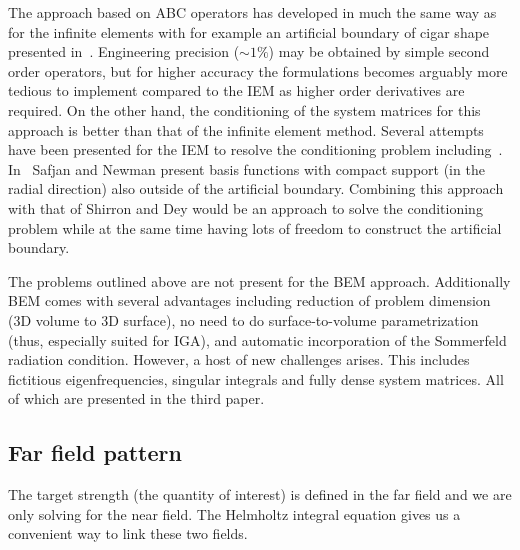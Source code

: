 The approach based on ABC operators has developed in much the same way as for the infinite elements with for example an artificial boundary of cigar shape presented in~\cite{Tezaur2001tdf}. Engineering precision ($\sim 1\%$) may be obtained by simple second order operators, but for higher accuracy the formulations becomes arguably more tedious to implement compared to the IEM as higher order derivatives are required. On the other hand, the conditioning of the system matrices for this approach is better than that of the infinite element method. Several attempts have been presented for the IEM to resolve the conditioning problem including~\cite{Dreyer2003ico,Safjan2001tic,Safjan2002tdi}. In~\cite{Safjan2002tdi} Safjan and Newman present basis functions with compact support (in the radial direction) also outside of the artificial boundary. Combining this approach with that of Shirron and Dey would be an approach to solve the conditioning problem while at the same time having lots of freedom to construct the artificial boundary.

The problems outlined above are not present for the BEM approach. Additionally BEM comes with several advantages including reduction of problem dimension (3D volume to 3D surface), no need to do surface-to-volume parametrization (thus, especially suited for IGA), and automatic incorporation of the Sommerfeld radiation condition. However, a host of new challenges arises. This includes fictitious eigenfrequencies, singular integrals and fully dense system matrices. All of which are presented in the third paper.

\subsection{Far field pattern}
The target strength (the quantity of interest) is defined in the far field and we are only solving for the near field. The Helmholtz integral equation gives us a convenient way to link these two fields.

